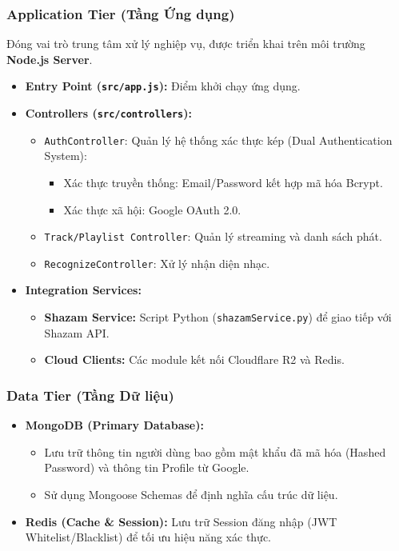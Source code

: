 \subsubsection{Application Tier (Tầng Ứng dụng)}
Đóng vai trò trung tâm xử lý nghiệp vụ, được triển khai trên môi trường \textbf{Node.js Server}.
\begin{itemize}
    \item \textbf{Entry Point (\texttt{src/app.js}):} Điểm khởi chạy ứng dụng.
    \item \textbf{Controllers (\texttt{src/controllers}):} 
    \begin{itemize}
        \item \texttt{AuthController}: Quản lý hệ thống xác thực kép (Dual Authentication System):
        \begin{itemize}
            \item Xác thực truyền thống: Email/Password kết hợp mã hóa Bcrypt.
            \item Xác thực xã hội: Google OAuth 2.0.
        \end{itemize}
        \item \texttt{Track/Playlist Controller}: Quản lý streaming và danh sách phát.
        \item \texttt{RecognizeController}: Xử lý nhận diện nhạc.
    \end{itemize}
    \item \textbf{Integration Services:}
    \begin{itemize}
        \item \textbf{Shazam Service:} Script Python (\texttt{shazamService.py}) để giao tiếp với Shazam API.
        \item \textbf{Cloud Clients:} Các module kết nối Cloudflare R2 và Redis.
    \end{itemize}
\end{itemize}

\subsubsection{Data Tier (Tầng Dữ liệu)}
\begin{itemize}
    \item \textbf{MongoDB (Primary Database):} 
    \begin{itemize}
        \item Lưu trữ thông tin người dùng bao gồm mật khẩu đã mã hóa (Hashed Password) và thông tin Profile từ Google.
        \item Sử dụng Mongoose Schemas để định nghĩa cấu trúc dữ liệu.
    \end{itemize}
    \item \textbf{Redis (Cache \& Session):} Lưu trữ Session đăng nhập (JWT Whitelist/Blacklist) để tối ưu hiệu năng xác thực.
\end{itemize}


